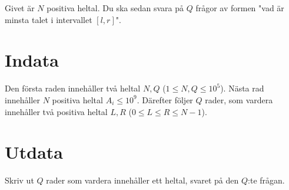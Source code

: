 Givet är $N$ positiva heltal. Du ska sedan svara på $Q$ frågor av formen "vad är minsta talet i intervallet $[l,r]$".


\section*{Indata}
Den första raden innehåller två heltal $N, Q$ ($1 \leq N,Q \leq 10^5 $).
Nästa rad innehåller $N$ positiva heltal $A_i \leq 10^9$.
Därefter följer $Q$ rader, som vardera innehåller två positiva heltal $L,R$ ($0 \leq L \leq R \leq N-1$).
\section*{Utdata}
Skriv ut $Q$ rader som vardera innehåller ett heltal, svaret på den $Q$:te frågan.
